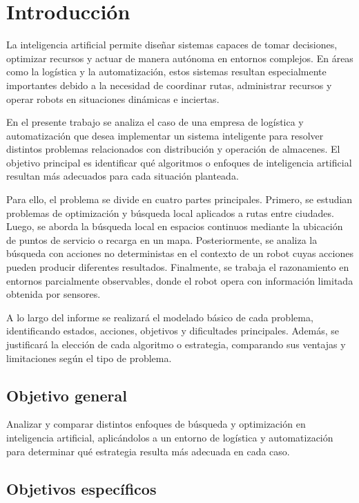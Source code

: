 
\section{Introducción}

La inteligencia artificial permite diseñar sistemas capaces de tomar decisiones, optimizar recursos y actuar de manera autónoma en entornos complejos. En áreas como la logística y la automatización, estos sistemas resultan especialmente importantes debido a la necesidad de coordinar rutas, administrar recursos y operar robots en situaciones dinámicas e inciertas.

En el presente trabajo se analiza el caso de una empresa de logística y automatización que desea implementar un sistema inteligente para resolver distintos problemas relacionados con distribución y operación de almacenes. El objetivo principal es identificar qué algoritmos o enfoques de inteligencia artificial resultan más adecuados para cada situación planteada.

Para ello, el problema se divide en cuatro partes principales. Primero, se estudian problemas de optimización y búsqueda local aplicados a rutas entre ciudades. Luego, se aborda la búsqueda local en espacios continuos mediante la ubicación de puntos de servicio o recarga en un mapa. Posteriormente, se analiza la búsqueda con acciones no deterministas en el contexto de un robot cuyas acciones pueden producir diferentes resultados. Finalmente, se trabaja el razonamiento en entornos parcialmente observables, donde el robot opera con información limitada obtenida por sensores.

A lo largo del informe se realizará el modelado básico de cada problema, identificando estados, acciones, objetivos y dificultades principales. Además, se justificará la elección de cada algoritmo o estrategia, comparando sus ventajas y limitaciones según el tipo de problema.

\subsection{Objetivo general}

Analizar y comparar distintos enfoques de búsqueda y optimización en inteligencia artificial, aplicándolos a un entorno de logística y automatización para determinar qué estrategia resulta más adecuada en cada caso.

\subsection{Objetivos específicos}

